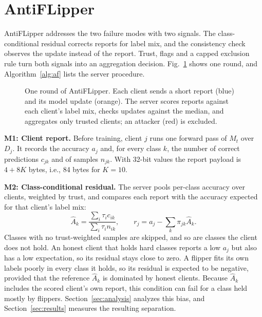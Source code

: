 \documentclass[conference]{IEEEtran}
\begin{document}
\section{AntiFLipper}
\label{sec:design}
AntiFLipper addresses the two failure modes with two signals. The class-conditional residual corrects reports for label mix, and the consistency check observes the update instead of the report. Trust, flags and a capped exclusion rule turn both signals into an aggregation decision. Fig.~\ref{fig:arch} shows one round, and Algorithm~\ref{alg:af} lists the server procedure.

\begin{figure}[t]
\centering
\resizebox{\columnwidth}{!}{}
\caption{One round of AntiFLipper. Each client sends a short report (blue) and its model update (orange). The server scores reports against each client's label mix, checks updates against the median, and aggregates only trusted clients; an attacker (red) is excluded.}
\label{fig:arch}
\end{figure}

\textbf{M1: Client report.} Before training, client $j$ runs one forward pass of $M_t$ over $D_j$. It records the accuracy $a_j$ and, for every class $k$, the number of correct predictions $c_{jk}$ and of samples $n_{jk}$. With 32-bit values the report payload is $4+8K$ bytes, i.e., 84 bytes for $K{=}10$.

\textbf{M2: Class-conditional residual.} The server pools per-class accuracy over clients, weighted by trust, and compares each report with the accuracy expected for that client's label mix:
\begin{equation}
\hat A_k=\frac{\sum_i \tau_i c_{ik}}{\sum_i \tau_i n_{ik}},\qquad
r_j=a_j-\sum_k \pi_{jk}\hat A_k .
\label{eq:cr}
\end{equation}
Classes with no trust-weighted samples are skipped, and so are classes the client does not hold. An honest client that holds hard classes reports a low $a_j$ but also has a low expectation, so its residual stays close to zero. A flipper fits its own labels poorly in every class it holds, so its residual is expected to be negative, provided that the reference $\hat A_k$ is dominated by honest clients. Because $\hat A_k$ includes the scored client's own report, this condition can fail for a class held mostly by flippers. Section~\ref{sec:analysis} analyzes this bias, and Section~\ref{sec:results} measures the resulting separation.
\end{document}
